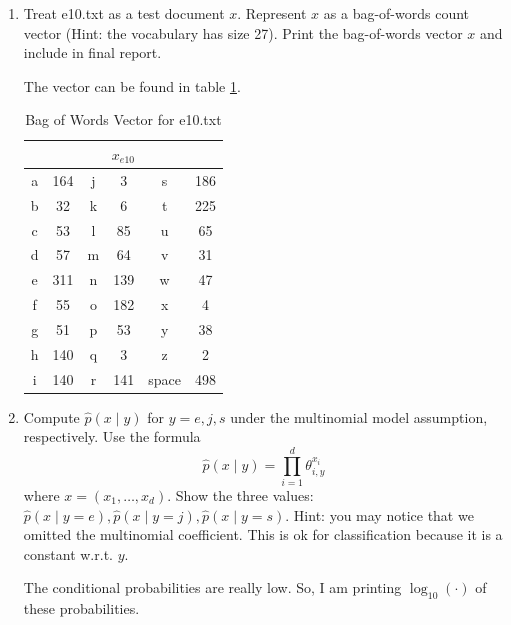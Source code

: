 \documentclass[a4paper]{article}
\theoremstyle{definition}
\newenvironment{soln}{
    \leavevmode\color{blue}\ignorespaces
}{}
\begin{document}
\begin{enumerate}
\item
Treat e10.txt as a test document $x$.
Represent $x$ as a bag-of-words count vector (Hint: the vocabulary has size 27).
Print the bag-of-words vector $x$ and include in final report.

\begin{soln}
    The vector can be found in table \ref{tab:4}.
    \begin{soln}
    \begin{table}[H]
        \centering
        \begin{tabular}{|c|c|c|c|c|c|}
            \hline
            \multicolumn{6}{|c|}{$x_{e10}$}\\
            \hline
            a & 164 & j & 3 & s & 186 \\
            \hline
            b & 32 & k & 6 & t & 225 \\
            \hline
            c & 53 & l & 85 & u & 65 \\
            \hline
            d & 57 & m & 64 & v & 31 \\
            \hline
            e & 311 & n & 139 & w & 47 \\
            \hline
            f & 55 & o & 182 & x & 4 \\
            \hline
            g & 51 & p & 53 & y & 38 \\
            \hline
            h & 140 & q & 3 & z & 2 \\
            \hline
            i & 140 & r & 141 & space & 498 \\
            \hline
        \end{tabular}
        \caption{Bag of Words Vector for \textsf{e10.txt}}
        \label{tab:4}
    \end{table}
\end{soln}
\end{soln}
\pagebreak

\item
Compute $\hat p(x \mid y)$ for $y=e, j, s$ under the multinomial model assumption, respectively.
Use the formula
$$\hat p(x \mid y) = \prod_{i=1}^d \theta_{i, y}^{x_i}$$
where $x=(x_1, \ldots, x_d)$.
Show the three values: $\hat p(x \mid y=e), \hat p(x \mid y=j), \hat p(x \mid y=s)$.
Hint: you may notice that we omitted the multinomial coefficient.  This is ok for classification because it is a constant w.r.t. $y$.

\begin{soln}
    The conditional probabilities are really low. So, I am printing $\log_{10}(\cdot)$ of these probabilities.


\end{soln}
\end{enumerate}
\end{document}

